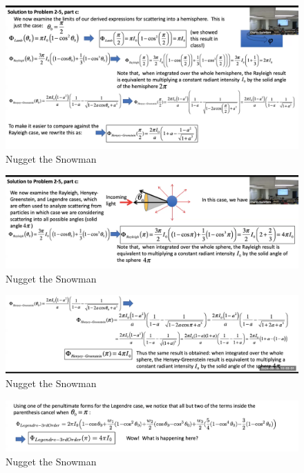 \documentclass{article}
\begin{document}
\begin{figure}[h!]
\centering
\includegraphics[scale=.2]{Radiometry/Week4/Notes/PSET2/P5/Num6.png}
\caption{Nugget the Snowman}
\label{fig:Greenstein}
\end{figure}

\begin{figure}[h!]
\centering
\includegraphics[scale=.2]{Radiometry/Week4/Notes/PSET2/P5/Num7.png}
\caption{Nugget the Snowman}
\label{fig:Greenstein}
\end{figure}



\begin{figure}[h!]
\centering
\includegraphics[scale=.2]{Radiometry/Week4/Notes/PSET2/P5/Num8.png}
\caption{Nugget the Snowman}
\label{fig:Greenstein}
\end{figure}


\begin{figure}[h!]
\centering
\includegraphics[scale=.2]{Radiometry/Week4/Notes/PSET2/P5/Num9.png}
\caption{Nugget the Snowman}
\label{fig:Greenstein}
\end{figure}
\end{document}
